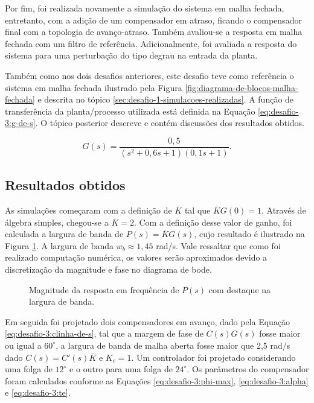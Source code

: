 Por fim, foi realizada novamente a simulação do sistema em malha fechada,
entretanto, com a adição de um compensador em atraso, ficando o compensador
final com a topologia de avanço-atraso. Também avaliou-se a resposta em malha
fechada com um filtro de referência. Adicionalmente, foi avaliada a resposta do
sistema para uma perturbação do tipo degrau na entrada da planta.

Também como nos dois desafios anteriores, este desafio teve como referência o
sistema em malha fechada ilustrado pela Figura
\ref{fig:diagrama-de-blocos-malha-fechada} e descrita no tópico
\ref{sec:desafio-1-simulacoes-realizadas}. A função de transferência da
planta/processo utilizada está definida na Equação \ref{eq:desafio-3:g-de-s}. O
tópico posterior descreve e contém discussões dos resultados obtidos.

\begin{equation}
    \label{eq:desafio-3:g-de-s}
    G(s) = \frac{0,5}{(s^2 + 0,6s +1)(0,1s + 1)}.
\end{equation}

\subsection{Resultados obtidos}
As simulações começaram com a definição de $\overline{K}$ tal que
$\overline{K}G(0) = 1$. Através de álgebra simples, chegou-se a $\overline{K} = 2$.
Com a definição desse valor de ganho, foi calculada a largura de banda de $P(s)
= \overline{K}G(s)$, cujo resultado é ilustrado na Figura
\ref{fig:desafio-3:questao-3}. A largura de banda $w_{b} \approx 1,45$ rad/s.
Vale ressaltar que como foi realizado computação numérica, os valores
serão aproximados devido a discretização da magnitude e fase no diagrama de bode.

\begin{figure}[!ht]
    \caption{Magnitude da resposta em frequência de $P(s)$
    com destaque na largura de banda.}
    \vspace{-10pt}
    \hspace{-30pt}
    \label{fig:desafio-3:questao-3}
    \begin{minipage}{\linewidth}
        
    \end{minipage}
\end{figure}

Em seguida foi projetado dois compensadores em avanço, dado pela Equação
\ref{eq:desafio-3:clinha-de-s}, tal que a margem de fase de $C(s)G(s)$ fosse
maior ou igual a $60^{\circ}$, a largura de banda de malha aberta fosse maior
que 2,5 rad/s dado $C(s) = {C}'(s)\overline{K}$ e $K_{c} = 1$. Um controlador
foi projetado considerando uma folga de $12^{\circ}$ e o outro para uma folga de
$24^{\circ}$. Os parâmetros do compensador foram calculados conforme as Equações
\ref{eq:desafio-3:phi-max}, \ref{eq:desafio-3:alpha} e \ref{eq:desafio-3:te}.

